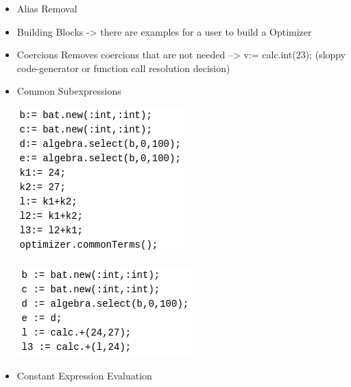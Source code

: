 \documentclass[11pt]{article}
\begin{document}
\begin{itemize}
\item Alias Removal
\item Building Blocks -> there are examples for a user to build a Optimizer
\item Coercions
Removes coercions that are not needed --> v:= calc.int(23);
(sloppy code-generator or function call resolution decision)

\item Common Subexpressions

\begin{center}
\includegraphics[width=.9\linewidth]{./Pictures/opt-common-subs-1.png}
\end{center}              \begin{center}
\includegraphics[width=.9\linewidth]{./Pictures/opt-common-subs-1+.png}
\end{center}

\item Constant Expression Evaluation


\end{itemize}
\end{document}
